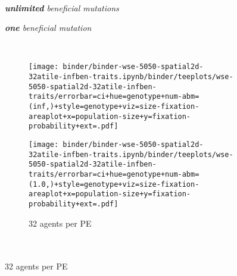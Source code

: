 \begin{figure}[h]
  \captionsetup[subfigure]{justification=raggedright}
  \begin{minipage}{0.7\textwidth}

    \begin{minipage}{0.04\textwidth}~\end{minipage}%
    \begin{minipage}{0.44\textwidth}
      \centering
      \itshape
      \textbf{unlimited} beneficial mutations
    \end{minipage}%
    \begin{minipage}{0.34\textwidth}
      \centering
      \itshape
      \textbf{one} beneficial mutation
    \end{minipage}

    ~\vspace{-1.5ex}

    \begin{subfigure}[b]{\linewidth}
      \begin{minipage}{0.88\textwidth}
        \begin{minipage}{0.53\textwidth}
          \texttt{[image: binder/binder-wse-5050-spatial2d-32atile-infben-traits.ipynb/binder/teeplots/wse-5050-spatial2d-32atile-infben-traits/errorbar=ci+hue=genotype+num-abm=(inf,)+style=genotype+viz=size-fixation-areaplot+x=population-size+y=fixation-probability+ext=.pdf]}%
        \end{minipage}%
        \begin{minipage}{0.47\textwidth}
          \texttt{[image: binder/binder-wse-5050-spatial2d-32atile-infben-traits.ipynb/binder/teeplots/wse-5050-spatial2d-32atile-infben-traits/errorbar=ci+hue=genotype+num-abm=(1.0,)+style=genotype+viz=size-fixation-areaplot+x=population-size+y=fixation-probability+ext=.pdf]}
        \end{minipage}
      \end{minipage}%
      \hspace{-3ex}%
      \begin{minipage}{0.12\textwidth}
        \raggedright
        \caption{\footnotesize 32 agents per PE\\~\\~\\}
        \label{fig:wse-inf-one:32}
      \end{minipage}%
    \end{subfigure}%


\end{minipage}
\end{figure}

